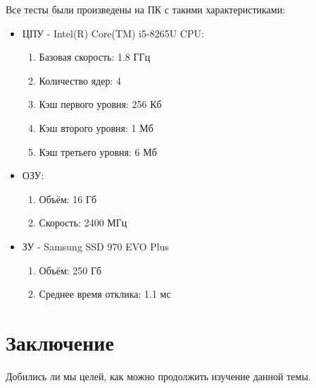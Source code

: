 Все тесты были произведены на ПК с такими характеристиками:

\begin{itemize}
	\item ЦПУ - Intel(R) Core(TM) i5-8265U CPU:
	\begin{enumerate}
		\item Базовая скорость: 1.8 ГГц
		\item Количество ядер: 4
		\item Кэш первого уровня: 256 Кб
		\item Кэш второго уровня: 1 Мб
		\item Кэш третьего уровня: 6 Мб
	\end{enumerate}
	\item ОЗУ:
	\begin{enumerate}
		\item Объём: 16 Гб
		\item Скорость: 2400 МГц
	\end{enumerate}
	\item ЗУ - Samsung SSD 970 EVO Plus
	\begin{enumerate}
		\item Объём: 250 Гб
		\item Среднее время отклика: 1.1 мс
	\end{enumerate}
\end{itemize}

\newpage
\section*{Заключение}
Добились ли мы целей, как можно продолжить изучение данной темы.

